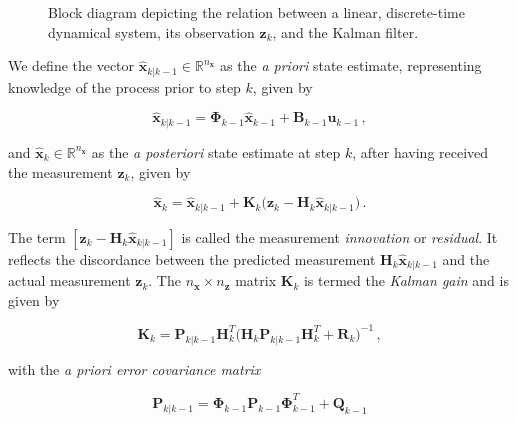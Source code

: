 \begin{figure}
{
}

\caption[Block diagram depicting the relation between a linear discrete-time dynamical system, its observation, and the Kalman filter.]{Block diagram depicting the relation between a linear, discrete-time dynamical system, its observation $\bm{z}_k$, and the Kalman filter.} \label{fig:kalman_filter_model}
\end{figure}

We define the vector $\hat{\bm{x}}_{k|k-1} \in \mathbb{R}^{n_{\bm{x}}}$ as the \emph{a priori} state estimate, representing knowledge of the process prior to step $k$, given by

\begin{equation}\label{eq:apriori_estimate}
  \hat{\bm{x}}_{k|k-1} = \bm{\Phi}_{k-1}\hat{\bm{x}}_{k-1}+\bm{B}_{k-1}\bm{u}_{k-1}\,,
\end{equation}

\noindent
and $\hat{\bm{x}}_k \in \mathbb{R}^{n_{\bm{x}}}$ as the \emph{a posteriori} state estimate at step $k$, after having received the measurement $\bm{z}_k$, given by

\begin{equation}\label{eq:aposteriori_estimate}
  \hat{\bm{x}}_k = \hat{\bm{x}}_{k|k-1} + \bm{K}_{k} \big(\bm{z}_k-\bm{H}_{k}\hat{\bm{x}}_{k|k-1} \big)\,.
\end{equation}

\noindent
The term $[\bm{z}_k-\bm{H}_{k}\hat{\bm{x}}_{k|k-1}]$ is called the measurement \emph{innovation} or \emph{residual}. It reflects the discordance between the predicted measurement $\bm{H}_{k}\hat{\bm{x}}_{k|k-1}$ and the actual measurement $\bm{z}_k$. The ${n_{\bm{x}}} \times {n_{\bm{z}}}$ matrix $\bm{K}_{k}$ is termed the \emph{Kalman gain} and is given by

\begin{equation}\label{eq:Kalman_gain}
  \bm{K}_{k} = \bm{P}_{k|k-1} \bm{H}^T_k \big(\bm{H}_k \bm{P}_{k|k-1} \bm{H}^T_k + \bm{R}_k \big)^{-1}\,,
\end{equation}

\noindent
with the \emph{a priori error covariance matrix}

\begin{equation}\label{eq:apriori_error_cov}
  \bm{P}_{k|k-1} = \bm{\Phi}_{k-1} \bm{P}_{k-1} \bm{\Phi}^T_{k-1} + \bm{Q}_{k-1}
\end{equation}

